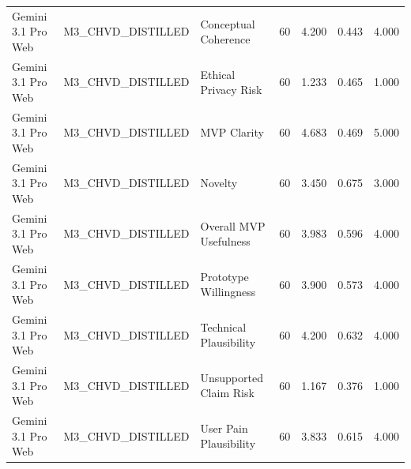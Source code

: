 \documentclass[10pt]{article}
\begin{document}
\begin{landscape}
\begin{longtable}{lllrrrr}
Gemini 3.1 Pro Web & M3\_CHVD\_DISTILLED & Conceptual Coherence & 60 & 4.200 & 0.443 & 4.000 \\
Gemini 3.1 Pro Web & M3\_CHVD\_DISTILLED & Ethical Privacy Risk & 60 & 1.233 & 0.465 & 1.000 \\
Gemini 3.1 Pro Web & M3\_CHVD\_DISTILLED & MVP Clarity & 60 & 4.683 & 0.469 & 5.000 \\
Gemini 3.1 Pro Web & M3\_CHVD\_DISTILLED & Novelty & 60 & 3.450 & 0.675 & 3.000 \\
Gemini 3.1 Pro Web & M3\_CHVD\_DISTILLED & Overall MVP Usefulness & 60 & 3.983 & 0.596 & 4.000 \\
Gemini 3.1 Pro Web & M3\_CHVD\_DISTILLED & Prototype Willingness & 60 & 3.900 & 0.573 & 4.000 \\
Gemini 3.1 Pro Web & M3\_CHVD\_DISTILLED & Technical Plausibility & 60 & 4.200 & 0.632 & 4.000 \\
Gemini 3.1 Pro Web & M3\_CHVD\_DISTILLED & Unsupported Claim Risk & 60 & 1.167 & 0.376 & 1.000 \\
Gemini 3.1 Pro Web & M3\_CHVD\_DISTILLED & User Pain Plausibility & 60 & 3.833 & 0.615 & 4.000 \\
\end{longtable}
\end{landscape}
\end{document}
